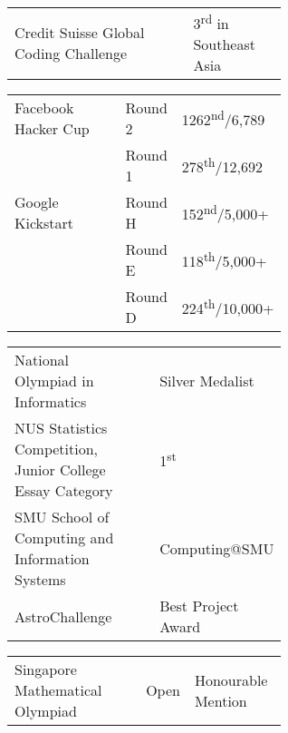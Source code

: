 \documentclass[a4paper,hidelinks]{resume} %
\begin{document}
\begin{minipage}[t]{0.55\textwidth}
    \begin{tabular}{p{0.60\linewidth} p{0\linewidth} l}
        {Credit Suisse Global Coding Challenge} & & 3\textsuperscript{rd} in Southeast Asia \\
    \end{tabular}
    \begin{tabular}{p{0.42\linewidth} p{0.18\linewidth} l}
        Facebook Hacker Cup & Round 2 & 1262\textsuperscript{nd}/6,789\\
        & Round 1 & 278\textsuperscript{th}/12,692 \\
        Google Kickstart & Round H & 152\textsuperscript{nd}/5,000+ \\
        & Round E & 118\textsuperscript{th}/5,000+\\
        & Round D & 224\textsuperscript{th}/10,000+ \\
    \end{tabular}
    
    \sectionspace %
    
    
    
    \begin{tabular}{p{0.60\linewidth} p{0\linewidth} l}
        National Olympiad in Informatics & & Silver Medalist \\
        NUS Statistics Competition, Junior College Essay Category & & 1\textsuperscript{st} \\
        SMU School of Computing and Information Systems & & Computing@SMU\\
        AstroChallenge & & Best Project Award\\
    \end{tabular}
    \begin{tabular}{p{0.48\linewidth} p{0.12\linewidth} l}
        Singapore Mathematical Olympiad & Open & Honourable Mention\\
    \end{tabular}
    
    \sectionspace %
    

\end{minipage} %
\end{document}
